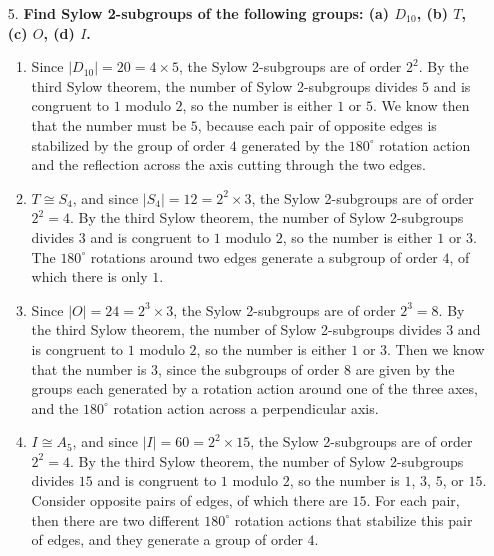 \documentclass[a4paper,12pt]{article}
\begin{document}
\begin{enumerate}
    \item[5.]
        \boldmath
        \textbf{Find Sylow 2-subgroups of the following groups: (a) $D_{10}$, (b) $T$, (c) $O$, (d) $I$.} \par
        \unboldmath
        \begin{enumerate}
            \item
                Since $|D_{10}| = 20 = 4 \times 5$, the Sylow 2-subgroups are of order $2^2$. By the third Sylow theorem, the number of Sylow 2-subgroups divides $5$ and is congruent to $1$ modulo $2$, so the number is either $1$ or $5$. We know then that the number must be $5$, because each pair of opposite edges is stabilized by the group of order $4$ generated by the $180^\circ$ rotation action and the reflection across the axis cutting through the two edges.

            \item
                $T \cong S_4$, and since $|S_4| = 12 = 2^2 \times 3$, the Sylow 2-subgroups are of order $2^2 = 4$. By the third Sylow theorem, the number of Sylow 2-subgroups divides $3$ and is congruent to $1$ modulo $2$, so the number is either $1$ or $3$. The $180^\circ$ rotations around two edges generate a subgroup of order $4$, of which there is only $1$.

            \item
                Since $|O| = 24 = 2^3 \times 3$, the Sylow 2-subgroups are of order $2^3 = 8$. By the third Sylow theorem, the number of Sylow 2-subgroups divides $3$ and is congruent to $1$ modulo $2$, so the number is either $1$ or $3$. Then we know that the number is $3$, since the subgroups of order $8$ are given by the groups each generated by a rotation action around one of the three axes, and the $180^\circ$ rotation action across a perpendicular axis.

            \item
                $I \cong A_5$, and since $|I| = 60 = 2^2 \times 15$, the Sylow 2-subgroups are of order $2^2 = 4$. By the third Sylow theorem, the number of Sylow 2-subgroups divides $15$ and is congruent to $1$ modulo $2$, so the number is $1$, $3$, $5$, or $15$. Consider opposite pairs of edges, of which there are $15$. For each pair, then there are two different $180^\circ$ rotation actions that stabilize this pair of edges, and they generate a group of order $4$.
        \end{enumerate}


\end{enumerate}
\end{document}
